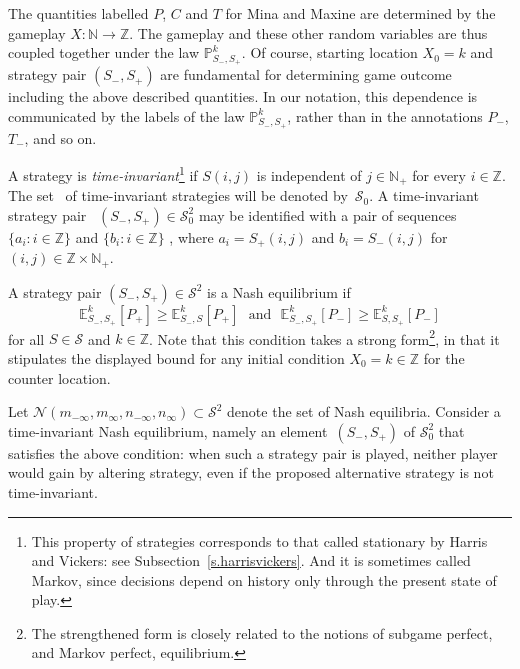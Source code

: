 \documentclass[letterpaper,11pt,oneside,reqno]{amsbook}
\newcommand{\PP}{\ensuremath{\mathbb{P}}}
\newcommand{\N}{\ensuremath{\mathbb{N}}}
\newcommand{\Z}{\ensuremath{\mathbb{Z}}}
\newcommand{\E}[0]{\mathbb{E}}
\numberwithin{figure}{chapter}
\theoremstyle{definition}
\theoremstyle{definition}
\theoremstyle{definition}
\theoremstyle{definition}
\theoremstyle{definition}
\newcommand{\mc}{\mathcal}
\newcommand{\nwithzero}{\N}
\newcommand{\nwithoutzero}{\N_+}
\newcommand{\tis}{\mc{S}_0}
\newcommand\egameplay[3]{\E^{#3}_{#1,#2}}
\def\hfff#1{\label{#1}}
\begin{document}
The quantities labelled $P$, $C$ and $T$ for Mina and Maxine are determined by the gameplay $X:\nwithzero \to \Z$. The gameplay and these other random variables are thus coupled together under the law\hfff{lawexpect} $\PP_{S_-,S_+}^k$. Of course, starting location $X_0 = k$ and strategy pair $(S_-,S_+)$ are fundamental for determining game outcome including the above described quantities. In our notation, this dependence is communicated by the labels of the law $\PP_{S_-,S_+}^k$, rather than in the annotations $P_-$, $T_-$, and so on.


 
 



A strategy is {\em time-invariant}\footnote{This property of strategies corresponds to that called stationary by Harris and Vickers: see Subsection~\ref{s.harrisvickers}. And it is sometimes called Markov, since decisions depend on history only through the present state of play.}
if $S(i,j)$ is independent of $j \in \nwithoutzero$ for every $i \in \Z$. 
The set~\hfff{timeinvariant} of time-invariant strategies will be denoted by~$\tis$. A time-invariant strategy pair~\hfff{typicalnotation} $(S_-,S_+) \in \mc{S}_0^2$
may be identified with a pair of sequences $\big\{ a_i: i \in \Z \big\}$ and  $\big\{ b_i: i \in \Z \big\}$ , where 
 $a_i = S_+(i,j)$ and $b_i = S_-(i,j)$ for $(i,j) \in \Z \times \nwithoutzero$. 



A strategy pair $(S_-,S_+) \in \mc{S}^2$ is a Nash equilibrium if 
$$
 \egameplay{S_-}{S_+}{k} [P_+] \geq  \egameplay{S_-}{S}{k} [P_+]  \, \, \, \,
\textrm{and} \, \, \, \,  \egameplay{S_-}{S_+}{k} [P_-]  \geq  \egameplay{S}{S_+}{k} [P_-] 
$$
 for all $S \in \mc{S}$ and $k \in \Z$. Note that this condition takes a strong form\footnote{The strengthened form is closely related to the notions of subgame perfect, and Markov perfect, equilibrium.}, in that it stipulates the displayed bound for any initial condition $X_0 = k \in \Z$ for the counter location.

Let $\mc{N}(m_{-\infty},m_\infty,n_{-\infty},n_\infty) \subset \mc{S}^2$ denote the set\hfff{nash} of Nash equilibria. Consider
a time-invariant Nash equilibrium, namely an element~$(S_-,S_+)$ of $\tis^2$ that satisfies the above condition: when such a strategy pair is played, neither player would gain by altering strategy, even if the proposed alternative strategy is not time-invariant.
\end{document}

